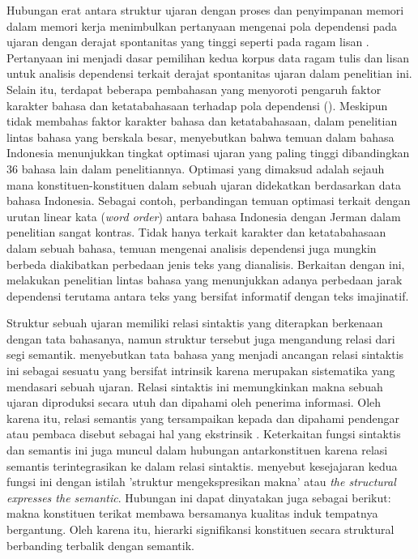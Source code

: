 Hubungan erat antara struktur ujaran dengan proses dan penyimpanan memori dalam memori kerja menimbulkan pertanyaan mengenai pola dependensi pada ujaran dengan derajat spontanitas yang tinggi seperti pada ragam lisan \citep{abney1991memory}. Pertanyaan ini menjadi dasar  pemilihan kedua korpus data ragam tulis dan lisan untuk analisis dependensi terkait derajat spontanitas ujaran dalam penelitian ini. Selain itu, terdapat beberapa pembahasan yang menyoroti pengaruh faktor karakter bahasa dan ketatabahasaan terhadap pola dependensi (\citealp{hawkins2014cross, jiang2015effects, wang2017effects}). Meskipun tidak membahas faktor karakter bahasa dan ketatabahasaan, dalam penelitian lintas bahasa yang berskala besar, \cite{futrell2015large} menyebutkan bahwa temuan dalam bahasa Indonesia menunjukkan tingkat optimasi ujaran yang paling tinggi dibandingkan 36 bahasa lain dalam penelitiannya. Optimasi yang dimaksud adalah sejauh mana konstituen-konstituen dalam sebuah ujaran didekatkan berdasarkan data bahasa Indonesia. Sebagai contoh, perbandingan temuan optimasi terkait dengan urutan linear kata (\textit{word order}) antara bahasa Indonesia dengan Jerman dalam penelitian \cite{futrell2015large} sangat kontras. Tidak hanya terkait karakter dan ketatabahasaan dalam sebuah bahasa, temuan mengenai analisis dependensi juga mungkin berbeda diakibatkan perbedaan jenis teks yang dianalisis. Berkaitan dengan ini, \cite{wang2017effects} melakukan penelitian lintas bahasa yang menunjukkan adanya perbedaan jarak dependensi terutama antara teks yang bersifat informatif dengan teks imajinatif.

Struktur sebuah ujaran memiliki relasi sintaktis yang diterapkan berkenaan dengan tata bahasanya, namun struktur tersebut juga mengandung relasi dari segi semantik. \cite{tesniere1959elements} menyebutkan tata bahasa yang menjadi ancangan relasi sintaktis ini sebagai sesuatu yang bersifat intrinsik karena merupakan sistematika yang mendasari sebuah ujaran. Relasi sintaktis ini memungkinkan makna sebuah ujaran diproduksi secara utuh dan dipahami oleh penerima informasi. Oleh karena itu, relasi semantis yang tersampaikan kepada dan dipahami pendengar atau pembaca disebut sebagai hal yang ekstrinsik \citep{tesniere1959elements}. Keterkaitan fungsi sintaktis dan semantis ini juga muncul dalam hubungan antarkonstituen karena relasi semantis terintegrasikan ke dalam relasi sintaktis. \cite{tesniere1959elements} menyebut kesejajaran kedua fungsi ini dengan istilah 'struktur mengekspresikan makna' atau \textit{the structural expresses the semantic}. Hubungan ini dapat dinyatakan juga sebagai berikut: makna konstituen terikat membawa bersamanya kualitas induk tempatnya bergantung. Oleh karena itu, hierarki signifikansi konstituen secara struktural berbanding terbalik dengan semantik.

